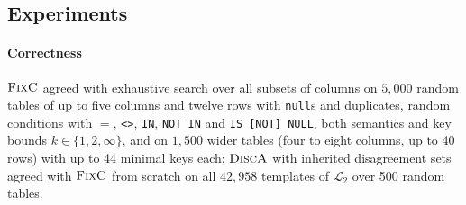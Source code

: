\documentclass[conference]{IEEEtran}
\theoremstyle{definition}
\newcommand{\sql}[1]{\texttt{#1}}
\newcommand{\nul}{\texttt{null}}
\begin{document}
\subsection{Experiments}\label{sec:exp-disc}

\paragraph*{Correctness} $\textsc{FixC}$ agreed with exhaustive search over all subsets of columns
on $5{,}000$ random tables of up to five columns and twelve rows with \nul s and duplicates, random
conditions with $=$, \sql{<>}, \sql{IN}, \sql{NOT IN} and \sql{IS [NOT] NULL}, both semantics and
key bounds $k\in\{1,2,\infty\}$, and on $1{,}500$ wider tables (four to eight columns, up to 40
rows) with up to 44 minimal keys each; $\textsc{DiscA}$ with inherited disagreement sets agreed with
$\textsc{FixC}$ from scratch on all $42{,}958$ templates of $\mathcal L_2$ over 500 random tables.
\end{document}
